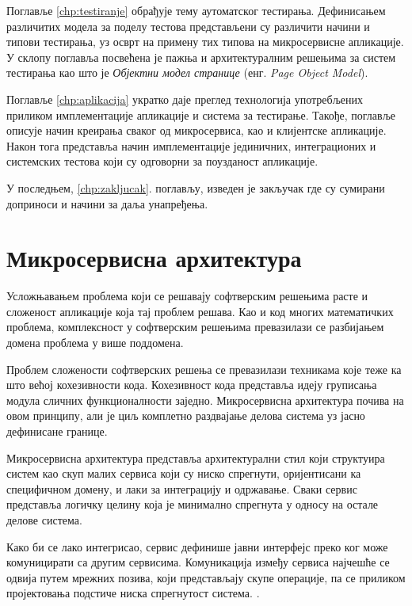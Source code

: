 \documentclass[12pt,oneside]{memoir}
\begin{document}
Поглавље \ref{chp:testiranje} обрађује тему аутоматског тестирања. Дефинисањем различитих модела за поделу тестова представљени су различити начини и типови тестирања, уз осврт на примену тих типова на микросервисне апликације. У склопу поглавља посвећена је пажња и архитектуралним решењима за систем тестирања као што је \textit{Објектни модел странице} (енг. \textit{Page Object Model}).

Поглавље \ref{chp:aplikacija} укратко даје преглед технологија употребљених приликом имплементације апликације и система за тестирање. Такође, поглавље описује начин креирања сваког од микросервиса, као и клијентске апликације. Након тога представља начин имплементације јединичних, интеграционих и системских тестова који су одговорни за поузданост апликације.

 У последњем, \ref{chp:zakljucak}. поглављу, изведен је закључак где су сумирани доприноси и начини за даља унапређења.



\chapter{Микросервисна архитектура}
\label{chp:mikroservisi}

Усложњавањем проблема који се решавају софтверским решењима расте и сложеност апликације која тај проблем решава. Као и код многих математичких проблема, комплексност у софтверским решењима превазилази се разбијањем домена проблема у више поддомена. 

Проблем сложености софтверских решења се превазилази техникама које теже ка што већој кохезивности кода. Кохезивност кода представља идеју груписања модула сличних функционалности заједно. Микросервисна архитектура почива на овом принципу, али је циљ комплетно раздвајање делова система уз јасно дефинисане границе. 

Микросервисна архитектура представља архитектурални стил који структуира систем као скуп малих сервиса који су ниско спрегнути, оријентисани ка специфичном домену, и лаки за интеграцију и одржавање. Сваки сервис представља логичку целину која је минимално спрегнута у односу на остале делове система.

Како би се лако интегрисао, сервис дефинише јавни интерфејс преко ког може комуницирати са другим сервисима. Комуникација између сервиса најчешће се одвија путем мрежних позива, који представљају скупе операције, па се приликом пројектовања подстиче ниска спрегнутост система. \cite{microservicesBook}.
\end{document}
